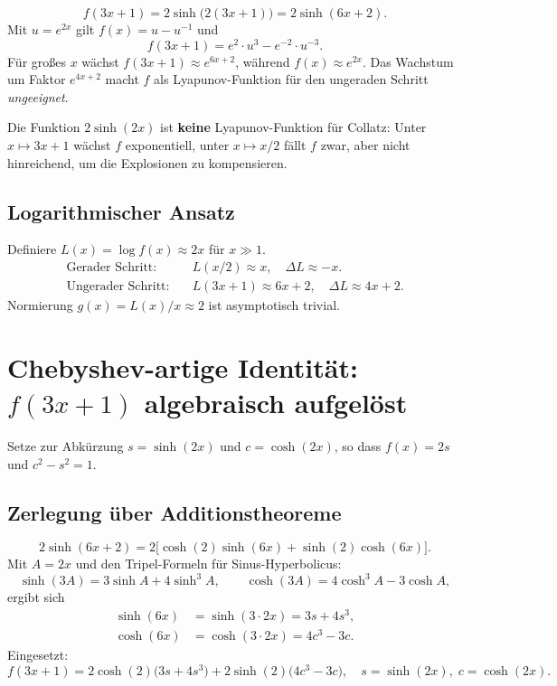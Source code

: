 \documentclass[12pt,a4paper]{article}
\newcommand{\sinh}{\operatorname{sinh}}
\renewcommand{\cosh}{\operatorname{cosh}}
\begin{document}
\[
  f(3x+1) = 2\sinh\!\bigl(2(3x+1)\bigr) = 2\sinh(6x+2).
\]
Mit $u = e^{2x}$ gilt $f(x) = u - u^{-1}$ und
\[
  f(3x+1) = e^{2} \cdot u^{3} - e^{-2} \cdot u^{-3}.
\]
Für großes $x$ wächst $f(3x+1) \approx e^{6x+2}$, während $f(x) \approx e^{2x}$.
Das Wachstum um Faktor $e^{4x+2}$ macht $f$ als Lyapunov-Funktion
für den ungeraden Schritt \emph{ungeeignet}.

\begin{tcolorbox}[warnung]
Die Funktion $2\sinh(2x)$ ist \textbf{keine} Lyapunov-Funktion für Collatz:
Unter $x \mapsto 3x+1$ wächst $f$ exponentiell, unter $x \mapsto x/2$ fällt $f$
zwar, aber nicht hinreichend, um die Explosionen zu kompensieren.
\end{tcolorbox}

\subsection{Logarithmischer Ansatz}

Definiere $L(x) = \log f(x) \approx 2x$ für $x \gg 1$.
\begin{align*}
  \text{Gerader Schritt:} &\quad L(x/2) \approx x, \quad \Delta L \approx -x.\\
  \text{Ungerader Schritt:} &\quad L(3x+1) \approx 6x+2, \quad \Delta L \approx 4x+2.
\end{align*}
Normierung $g(x) = L(x)/x \approx 2$ ist asymptotisch trivial.

\section{Chebyshev-artige Identität: $f(3x+1)$ algebraisch aufgelöst}

Setze zur Abkürzung $s = \sinh(2x)$ und $c = \cosh(2x)$,
so dass $f(x) = 2s$ und $c^2 - s^2 = 1$.

\subsection{Zerlegung über Additionstheoreme}

\[
  2\sinh(6x+2) = 2\bigl[\cosh(2)\sinh(6x) + \sinh(2)\cosh(6x)\bigr].
\]
Mit $A = 2x$ und den Tripel-Formeln für Sinus-Hyperbolicus:
\[
  \sinh(3A) = 3\sinh A + 4\sinh^3 A,
  \qquad
  \cosh(3A) = 4\cosh^3 A - 3\cosh A,
\]
ergibt sich
\begin{align*}
  \sinh(6x) &= \sinh(3 \cdot 2x) = 3s + 4s^3,\\
  \cosh(6x) &= \cosh(3 \cdot 2x) = 4c^3 - 3c.
\end{align*}
Eingesetzt:
\[
  \boxed{
    f(3x+1) = 2\cosh(2)\bigl(3s + 4s^3\bigr)
            + 2\sinh(2)\bigl(4c^3 - 3c\bigr),
    \quad s = \sinh(2x),\; c = \cosh(2x).
  }
\]
\end{document}

